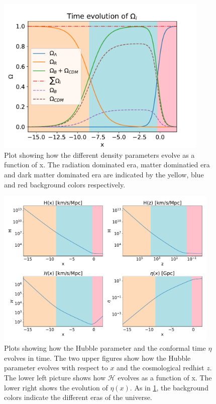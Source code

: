 \documentclass[12pt]{article}
\begin{document}
\begin{figure}[h]
    \centering
    \includegraphics[width=0.9\textwidth]{omega_plot.pdf}
    \caption{Plot showing how the different density parameters evolve as a function of x. The radiation dominated era, matter dominatied era and dark matter dominated era are indicated by the yellow, blue and red background colors respectively.}
    \label{fig:omega}
\end{figure}

\begin{figure}[h]
    \centering
    \includegraphics[width=0.95\textwidth]{H_eta_plots.pdf}
    \caption{Plots showing how the Hubble parameter and the conformal time $\eta$ evolves in time. The two upper figures show how the Hubble parameter evolves with respect to $x$ and the cosmological redhist $z$. The lower left picture shows how $\mathcal{H}$ evolves as a function of x. The lower right shows the evolution of $\eta(x)$. As in \cref{fig:omega}, the background colors indicate the different eras of the universe.}
    \label{fig:H_eta}
\end{figure}

{}

\end{document}
